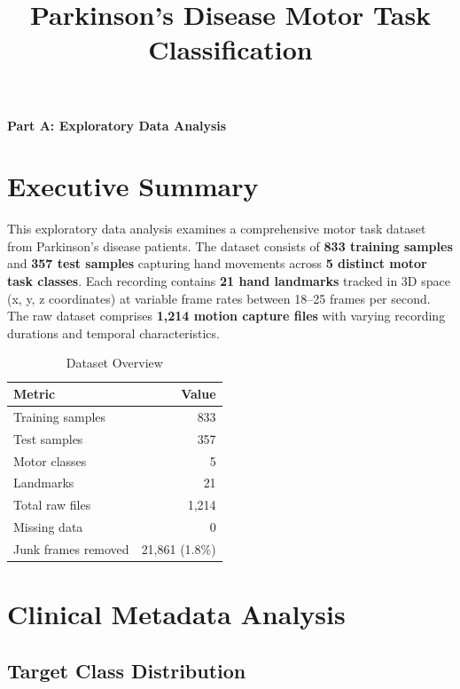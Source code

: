 \documentclass[11pt,twocolumn]{article}
\title{\textbf{Parkinson's Disease Motor Task Classification}}
\author{}
\date{}
\begin{document}
\maketitle
\begin{center}
\textbf{\Large Part A: Exploratory Data Analysis}
\end{center}


\section{Executive Summary}

This exploratory data analysis examines a comprehensive motor task dataset from Parkinson's disease patients. The dataset consists of \textbf{833 training samples} and \textbf{357 test samples} capturing hand movements across \textbf{5 distinct motor task classes}. Each recording contains \textbf{21 hand landmarks} tracked in 3D space (x, y, z coordinates) at variable frame rates between 18--25 frames per second. The raw dataset comprises \textbf{1,214 motion capture files} with varying recording durations and temporal characteristics.

\begin{table}[H]
\small
\centering
\setlength{\tabcolsep}{3pt}
\begin{tabular}{lr}
\toprule
\textbf{Metric} & \textbf{Value} \\
\midrule
Training samples & 833 \\
Test samples & 357 \\
Motor classes & 5 \\
Landmarks & 21 \\
Total raw files & 1,214 \\
Missing data & 0 \\
Junk frames removed & 21,861 (1.8\%) \\
\bottomrule
\end{tabular}
\caption{\small Dataset Overview}
\end{table}

\section{Clinical Metadata Analysis}

\subsection{Target Class Distribution}
\end{document}
